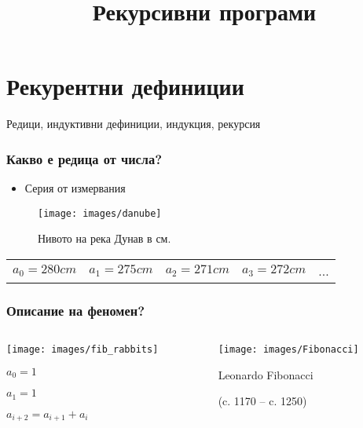 \documentclass{beamer}
\begin{document}
\title[Увод в програмирането]{Рекурсивни програми} 
\frame{\titlepage} 


\section{Рекурентни дефиниции}

\begin{frame}
\centerline{Редици, индуктивни дефиниции, индукция, рекурсия}
\end{frame}


\begin{frame}[fragile]
\frametitle{Какво е редица от числа?}

\begin{itemize}
  \item Серия от измервания 
\end{itemize}



\begin{figure}[]
  \centering
  \texttt{[image: images/danube]}   
  \caption{Нивото на река Дунав в см.}
\end{figure}


\begin{flushleft}
\begin{tabular}{|c|c|c|c|c}
$a_0=280cm$ & $a_1=275cm$ & $a_2=271cm$ & $a_3=272cm$ & ...
\end{tabular}
  
\end{flushleft}


\end{frame}



\begin{frame}[fragile]
\frametitle{Описание на феномен?}
\begin{columns}[t]
  \begin{column}{0.6\textwidth}
    \texttt{[image: images/fib\_rabbits]}
  
$a_0=1$


$a_1=1$


$a_{i+2} = a_{i+1} + a_i $
  \end{column}
  \begin{column}{0.4\textwidth}
\vspace*{-150px}

   \begin{center}
   \texttt{[image: images/Fibonacci]}    
     
     Leonardo Fibonacci 

     (c. 1170 – c. 1250)
   \end{center}
  \end{column}
\end{columns}




\end{frame}
\end{document}
